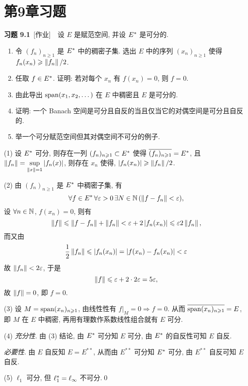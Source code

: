 \section{第9章习题}

	\textbf{习题 9.1}\ [作业]\ \ 设 $ E $ 是赋范空间, 并设 $ E^{*} $ 是可分的.
	\begin{enumerate}[(1)]
		\item 令 $ (f_{n})_{n\geqslant1} $ 是 $ E^{*} $ 中的稠密子集. 选出 $ E $ 中的序列 $ (x_{n})_{n\geqslant1} $ 使得 $ f_{n}(x_{n})\geqslant \left\| f_{n} \right\|/2 $.
		\item 任取 $ f\in E^{*} $. 证明: 若对每个 $ x_{n} $ 有 $ f(x_{n})=0 $, 则 $ f=0 $. 
		\item 由此导出 $ \operatorname{span}(x_{1}, x_{2}, \dots) $ 在 $ E $ 中稠密且 $ E $ 是可分的.
		\item 证明: 一个 Banach 空间是可分且自反的当且仅当它的对偶空间是可分且自反的.
		\item 举一个可分赋范空间但其对偶空间不可分的例子. 
	\end{enumerate}
	\begin{Proof}
		(1) 设 $ E^{*} $ 可分, 则存在一列 $ (f_{n})_{n\geqslant1}\subset E^{*} $ 使得 $ \overline{(f_{n})_{n\geqslant1}}=E^{*} $, 且 $ \left\| f_{n} \right\|=\sup\limits_{\left\| x \right\|=1}\left| f_{n}(x) \right|  $, 则存在 $ x_{n} $ 使得, $ \left| f_{n}(x_{n}) \right| \geqslant\left\| f_{n} \right\|/2 $.

		(2) 由 $ (f_{n})_{n\geqslant1} $ 是 $ E^{*} $ 中稠密子集, 有
		\[
			\forall f\in E^{*}\,\forall \varepsilon>0\,\exists N\in\mathbb{N}\,(\left\| f-f_{n} \right\|<\varepsilon),
		\]
		设 $ \forall n\in\mathbb{N} $, $ f(x_{n})=0 $, 则有
		\[
			\left\| f \right\|\leqslant\left\| f-f_{n} \right\|+\left\| f_{n} \right\|<\varepsilon + 2\left| f_{n}(x_{n}) \right| \leqslant \varepsilon 2\left\| f_{n} \right\|,
		\]
		而又由
		\[
			\frac{1}{2}\left\| f_{n} \right\|\leqslant\left| f_{n}(x_{n}) \right| =\left| f(x_{n})-f_{n}(x_{n}) \right| <\varepsilon
		\]
		故 $ \left\| f_{n} \right\|<2\varepsilon $, 于是
		\[
			\left\| f \right\|\leqslant\varepsilon+2\cdot 2\varepsilon=5\varepsilon,
		\]
		故 $ \left\| f \right\|=0 $, 即 $ f=0 $.

		(3) 设 $ M=\operatorname{span}(x_{n})_{n\geqslant1} $, 由线性性有 $ f|_{M}=0\Rightarrow f=0 $. 从而 $ \overline{\operatorname{span}(x_{n})_{n\geqslant1}}=E $, 即 $ M $ 在 $ E $ 中稠密, 再用有理数作系数线性组合就有 $ E $ 可分.

		(4) \textsl{充分性}. 由 (3) 结论, 由 $ E^{*} $ 可分知 $ E $ 可分, 由 $ E^{*} $ 的自反性可知 $ E $ 自反.

		\textsl{必要性}. 由 $ E $ 自反知 $ E=E^{**} $, 从而由 $ E^{**} $ 可分知 $ E^{*} $ 可分, 由 $ E^{**} $ 自反可知 $ E $ 自反.

		(5) $ \ell_{1} $ 可分, 但 $ \ell_{1}^{*}=\ell_{\infty} $ 不可分.\qed
	\end{Proof}
	
